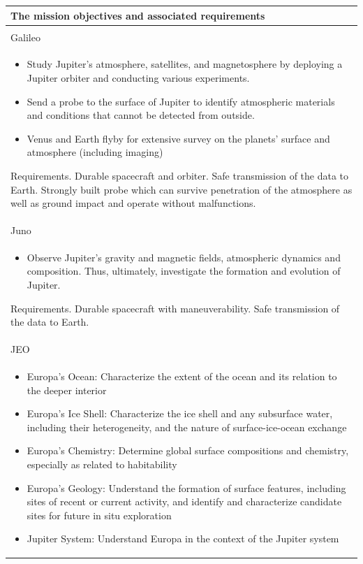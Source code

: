 \begin{supertabular}{p{\textwidth}}
  The mission objectives and associated requirements \\ \hline \\

  Galileo \\
  \begin{itemize}
  \item Study Jupiter’s atmosphere, satellites, and magnetosphere by
    deploying a Jupiter orbiter and conducting various experiments.
  \item Send a probe to the surface of Jupiter to identify atmospheric
    materials and conditions that cannot be detected from outside.
  \item Venus and Earth flyby for extensive survey on the planets’
    surface and atmosphere (including imaging)
  \end{itemize}
  Requirements. Durable spacecraft and orbiter. Safe transmission of
  the data to Earth.  Strongly built probe which can survive
  penetration of the atmosphere as well as ground impact and operate
  without malfunctions. \\

  Juno \\
  \begin{itemize}
  \item Observe Jupiter's gravity and magnetic fields, atmospheric
    dynamics and composition. Thus, ultimately, investigate the
    formation and evolution of Jupiter.
  \end{itemize}

  Requirements. Durable spacecraft with maneuverability. Safe
  transmission of the data to Earth. \\

  JEO \\
  \begin{itemize}
  \item Europa’s Ocean: Characterize the extent of the ocean and its
    relation to the deeper interior
  \item Europa’s Ice Shell: Characterize the ice shell and any
    subsurface water, including their heterogeneity, and the nature of
    surface-ice-ocean exchange
  \item Europa’s Chemistry: Determine global surface compositions and
    chemistry, especially as related to habitability
  \item Europa’s Geology: Understand the formation of surface
    features, including sites of recent or current activity, and
    identify and characterize candidate sites for future in situ
    exploration
  \item Jupiter System: Understand Europa in the context of the
    Jupiter system
  \end{itemize} \\


\end{supertabular}
